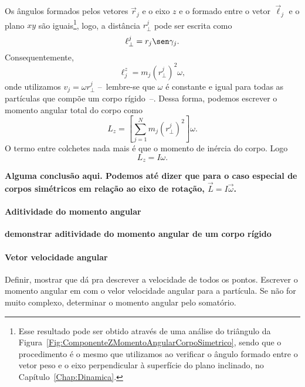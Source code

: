 Os ângulos formados pelos vetores $\vec{r}_j$ e o eixo $z$ e o formado entre o vetor $\vec{\ell}_j$ e o plano $xy$ são iguais\footnote{Esse resultado pode ser obtido através de uma análise do triângulo da Figura~\ref{Fig:ComponenteZMomentoAngularCorpoSimetrico}, sendo que o procedimento é o mesmo que utilizamos ao verificar o ângulo formado entre o vetor peso e o eixo perpendicular à superfície do plano inclinado, no Capítulo~\ref{Chap:Dinamica}.}, logo, a distância $r_{\perp}^j$ pode ser escrita como
\begin{equation}
  \ell_{\perp}^j = r_j\sen\gamma_j.
\end{equation}
%
Consequentemente, 
\begin{equation}
  \ell_{j}^{z} = m_j (r_{\perp}^j)^2 \omega,
\end{equation}
%
onde utilizamos $v_j = \omega r_{\perp}^j$ --~lembre-se que $\omega$ é constante e igual para todas as partículas que compõe um corpo rígido~--. Dessa forma, podemos escrever o momento angular total do corpo como
\begin{equation}
  L_z = \left[\sum_{j=1}^N m_j (r_{\perp}^j)^2\right] \omega.
\end{equation}
%
O termo entre colchetes nada mais é que o momento de inércia do corpo. Logo
\begin{equation}
  L_z = I \omega.
\end{equation}

\textbf{Alguma conclusão aqui. Podemos até dizer que para o caso especial de corpos simétricos em relação ao eixo de rotação, $\vec{L} = I\vec{\omega}$.}

\paragraph{Aditividade do momento angular}

\textbf{demonstrar aditividade do momento angular de um corpo rígido}

\paragraph{Vetor velocidade angular}

Definir, mostrar que dá pra descrever a velocidade de todos os pontos. Escrever o momento angular em com o velor velocidade angular para a partícula. Se não for muito complexo, determinar o momento angular pelo somatório.

